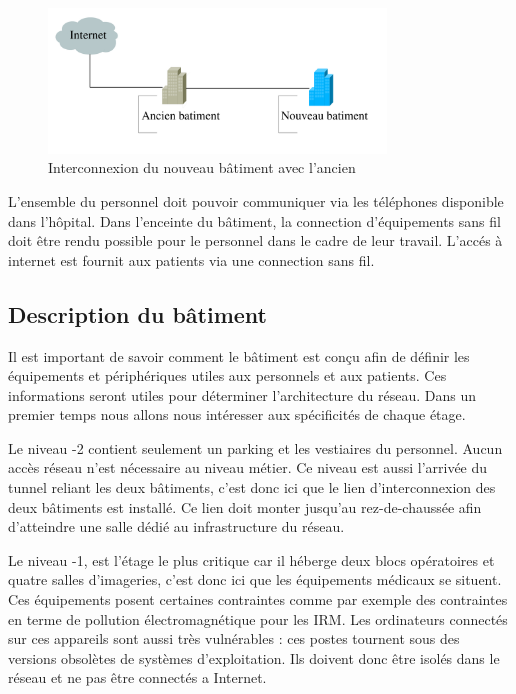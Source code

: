 %
    \cleardoublepage
%

\begin{figure}[!ht]
    \center
    \includegraphics[width=0.8\textwidth]{./images/interco-batiment.png}
    \caption{Interconnexion du nouveau bâtiment avec l'ancien}
\end{figure}

%

L'ensemble du personnel doit pouvoir communiquer via les téléphones disponible dans l'hôpital.
Dans l'enceinte du bâtiment, la connection d'équipements sans fil doit être rendu possible pour le personnel dans le cadre de leur travail.
L'accés à internet est fournit aux patients via une connection sans fil.


%
    \cleardoublepage
%
%
\subsection{Description du bâtiment}

Il est important de savoir comment le bâtiment est conçu afin de définir les équipements et périphériques utiles aux personnels et aux patients.
Ces informations seront utiles pour déterminer l'architecture du réseau.
Dans un premier temps nous allons nous intéresser aux spécificités de chaque étage.

Le niveau -2 contient seulement un parking et les vestiaires du personnel.
Aucun accès réseau n'est nécessaire au niveau métier.
Ce niveau est aussi l'arrivée du tunnel reliant les deux bâtiments, c'est donc ici que le lien d'interconnexion des deux bâtiments est installé.
Ce lien doit monter jusqu'au rez-de-chaussée afin d'atteindre une salle dédié au infrastructure du réseau.

Le niveau -1, est l'étage le plus critique car il héberge deux blocs opératoires et quatre salles d'imageries, c'est donc ici que les équipements médicaux se situent.
Ces équipements posent certaines contraintes comme par exemple des contraintes en terme de pollution électromagnétique pour les IRM.
Les ordinateurs connectés sur ces appareils sont aussi très vulnérables : ces postes tournent sous des versions obsolètes de systèmes d'exploitation.
Ils doivent donc être isolés dans le réseau et ne pas être connectés a Internet.


